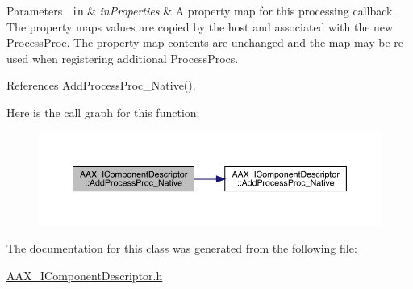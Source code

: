 \begin{DoxyParams}[1]{Parameters}
\mbox{\texttt{ in}}  & {\em in\+Properties} & A property map for this processing callback. The property map\textquotesingle{}s values are copied by the host and associated with the new Process\+Proc. The property map contents are unchanged and the map may be re-\/used when registering additional Process\+Procs. \\
\hline
\end{DoxyParams}


References Add\+Process\+Proc\+\_\+\+Native().

Here is the call graph for this function\+:
\nopagebreak
\begin{figure}[H]
\begin{center}
\leavevmode
\includegraphics[width=350pt]{a01781_a985d1aeb83e4e3065ac2ff4047c3e410_cgraph}
\end{center}
\end{figure}


The documentation for this class was generated from the following file\+:\begin{DoxyCompactItemize}
\item 
\mbox{\hyperlink{a00569}{A\+A\+X\+\_\+\+I\+Component\+Descriptor.\+h}}\end{DoxyCompactItemize}
